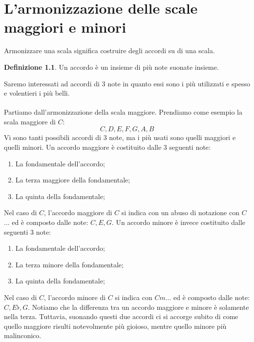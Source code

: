 \documentclass[12pt,a4paper]{report}
\theoremstyle{definition}
\newtheorem{Def}{Definizione}[chapter]
\theoremstyle{Theorem}
\theoremstyle{definition}
\theoremstyle{definition}
\theoremstyle{definition}
\begin{document}
	 		\chapter{L'armonizzazione delle scale maggiori e minori}
	 		Armonizzare una scala significa costruire degli accordi su di una scala.
	 		\begin{Def}
	 			Un accordo è un insieme di più note suonate insieme.
	 		\end{Def}
	 		Saremo interessati ad accordi di $3$ note in quanto essi sono i più utilizzati e spesso e volentieri i più belli.\\
	 		\\
	 		Partiamo dall'armonizzazione della scala maggiore.
	 		Prendiamo come esempio la scala maggiore di $C$:
	 		$$C,D,E,F,G,A,B$$
	 		Vi sono tanti possibili accordi di 3 note, ma i più usati sono quelli maggiori e quelli minori. Un accordo maggiore è costituito dalle 3 seguenti note: 
	 		\begin{enumerate}
	 			\item La fondamentale dell'accordo;\\
	 			\item La terza maggiore della fondamentale;\\
	 			\item La quinta della fondamentale;\\
	 		\end{enumerate}
	 		Nel caso di $C$, l'accordo maggiore di $C$ si indica con un abuso di notazione con $C$... ed è composto dalle note: $C,E,G$.
	 		Un accordo minore è invece costituito dalle seguenti 3 note:
	 		\begin{enumerate}
	 			\item La fondamentale dell'accordo;\\
	 			\item La terza minore della fondamentale;\\
	 			\item La quinta della fondamentale;\\
	 		\end{enumerate}
	 		Nel caso di $C$, l'accordo minore di $C$ si indica con $Cm$... ed è composto dalle note: $C,E\flat,G$.
	 		Notiamo che la differenza tra un accordo maggiore e minore è solamente nella terza. Tuttavia, suonando questi due accordi ci si accorge subito di come quello maggiore risulti notevolmente più gioioso, mentre quello minore più malinconico.
\end{document}
